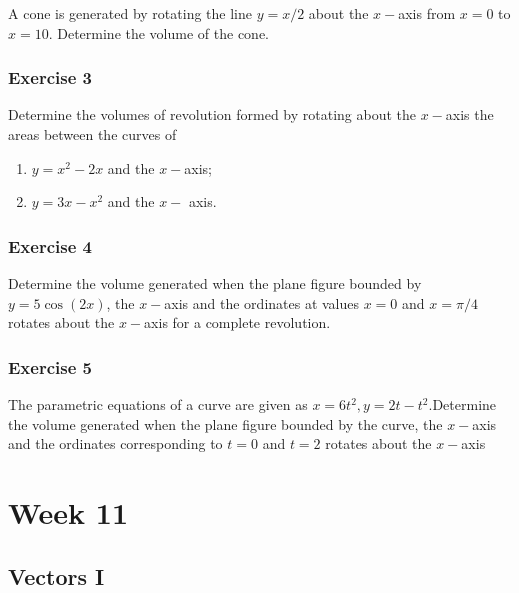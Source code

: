\documentclass[
  11pt,
  oneside]{book}
\providecommand{\tightlist}{%
  \setlength{\itemsep}{0pt}\setlength{\parskip}{0pt}}
\newcommand{\slide}{}
\theoremstyle{definition}
\theoremstyle{definition}
\theoremstyle{definition}
\theoremstyle{definition}
\theoremstyle{remark}
\begin{document}
A cone is generated by rotating the line \(y = x/2\) about the \(x-\)axis from \(x = 0\) to \(x = 10\). Determine the volume of the cone.

\slide

\subsection*{Exercise 3}\label{exercise-3-9}

Determine the volumes of revolution formed by rotating about the \(x-\)axis the areas between the curves of

\begin{enumerate}
\def\labelenumi{\arabic{enumi}.}
\tightlist
\item
  \(y = x^2 - 2x\) and the \(x-\)axis;
\item
  \(y = 3x - x^2\) and the \(x-\) axis.
\end{enumerate}

\slide

\subsection*{Exercise 4}\label{exercise-4-7}

Determine the volume generated when the plane figure bounded by \(y = 5\cos(2x)\), the \(x-\)axis and the ordinates at values \(x = 0\) and \(x = \pi/4\) rotates about the \(x-\)axis for a complete revolution.

\slide

\subsection*{Exercise 5}\label{exercise-5-5}

The parametric equations of a curve are given as \(x = 6t^2, y = 2t - t^2\).Determine the volume generated when the plane figure bounded by the curve, the \(x-\)axis and the ordinates corresponding to \(t = 0\) and \(t = 2\) rotates about the \(x-\)axis

\chapter{Week 11}\label{week-eleven}

\slide

\section{Vectors I}\label{vectors-i}
\end{document}
